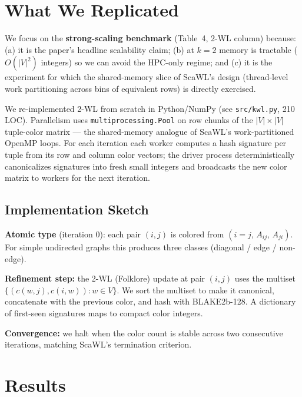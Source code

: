 \documentclass[11pt]{article}
\begin{document}
\section{What We Replicated}
We focus on the \textbf{strong-scaling benchmark} (Table~4, 2-WL column) because:
(a) it is the paper's headline scalability claim;
(b) at $k{=}2$ memory is tractable ($O(|V|^2)$ integers) so we can avoid the HPC-only regime; and
(c) it is the experiment for which the shared-memory slice of ScaWL's design (thread-level work partitioning across bins of equivalent rows) is directly exercised.

We re-implemented 2-WL from scratch in Python/NumPy (see \texttt{src/kwl.py}, 210 LOC). Parallelism uses \texttt{multiprocessing.Pool} on row chunks of the $|V|\times|V|$ tuple-color matrix --- the shared-memory analogue of ScaWL's work-partitioned OpenMP loops. For each iteration each worker computes a hash signature per tuple from its row and column color vectors; the driver process deterministically canonicalizes signatures into fresh small integers and broadcasts the new color matrix to workers for the next iteration.

\subsection{Implementation Sketch}
\textbf{Atomic type} (iteration 0): each pair $(i,j)$ is colored from $(i{=}j,\,A_{ij},\,A_{ji})$. For simple undirected graphs this produces three classes (diagonal / edge / non-edge).

\textbf{Refinement step:} the 2-WL (Folklore) update at pair $(i,j)$ uses the multiset $\{(c(w,j), c(i,w)) : w \in V\}$. We sort the multiset to make it canonical, concatenate with the previous color, and hash with BLAKE2b-128. A dictionary of first-seen signatures maps to compact color integers.

\textbf{Convergence:} we halt when the color count is stable across two consecutive iterations, matching ScaWL's termination criterion.

\section{Results}
\end{document}
